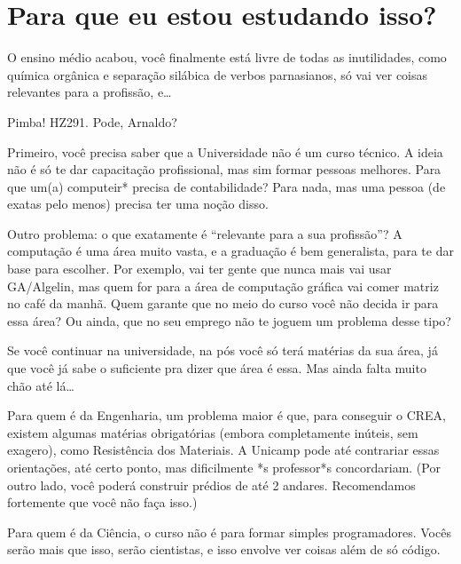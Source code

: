 
\section{Para que eu estou estudando isso?}

O ensino médio acabou, você finalmente está livre de todas as inutilidades, como
química orgânica e separação silábica de verbos parnasianos, só vai ver coisas
relevantes para a profissão, e{\dots}

Pimba! HZ291. Pode, Arnaldo?

Primeiro, você precisa saber que a Universidade não é um curso técnico. A ideia
não é só te dar capacitação profissional, mas sim formar pessoas melhores. Para
que um(a) computeir* precisa de contabilidade? Para nada, mas uma pessoa (de exatas
pelo menos) precisa ter uma noção disso.

Outro problema: o que exatamente é ``relevante para a sua profissão''?  A
computação é uma área muito vasta, e a graduação é bem generalista, para te dar
base para escolher. Por exemplo, vai ter gente que nunca mais vai usar
GA/Algelin, mas quem for para a área de computação gráfica vai comer matriz no
café da manhã. Quem garante que no meio do curso você não decida ir para essa
área? Ou ainda, que no seu emprego não te joguem um problema desse tipo?

Se você continuar na universidade, na pós você só terá matérias da sua área, já
que você já sabe o suficiente pra dizer que área é essa. Mas ainda falta muito
chão até lá{\dots}

Para quem é da Engenharia, um problema maior é que, para conseguir o CREA,
existem algumas matérias obrigatórias (embora completamente inúteis, sem
exagero), como Resistência dos Materiais. A Unicamp pode até contrariar essas
orientações, até certo ponto, mas dificilmente *s professor*s concordariam. (Por
outro lado, você poderá construir prédios de até 2 andares. Recomendamos
fortemente que você não faça isso.)

Para quem é da Ciência, o curso não é para formar simples programadores. Vocês
serão mais que isso, serão cientistas, e isso envolve ver coisas além de só
código.
